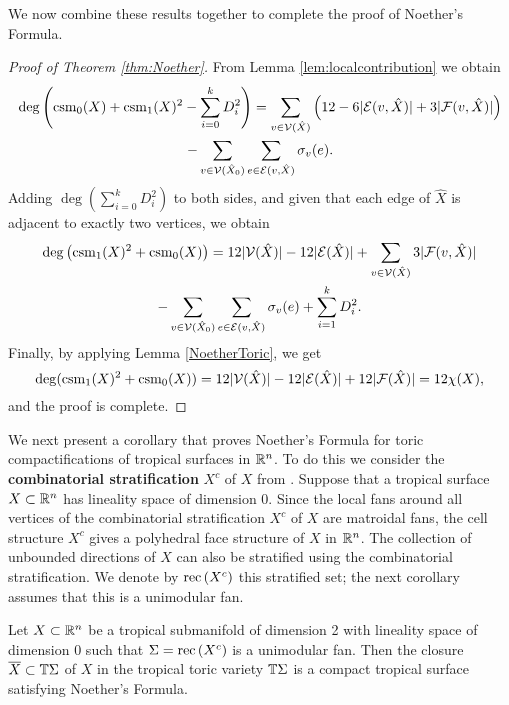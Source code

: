 We now combine these results together to complete the proof of Noether's Formula.

\begin{proof}[Proof of Theorem \ref{thm:Noether}]
From Lemma \ref{lem:localcontribution} we obtain
\begin{multline}\label{ChernSimp}
\deg \left( \operatorname{csm}_0(X) + \operatorname{csm}_1(X)^2 - \sum_{i = 0}^k D_i^2 \right) = 
\sum_{v \in {{\mathcal V}}(\hat{X})}  \left( 12 - 6|{{\mathcal E}}(v, \hat{X})| + 3|{{\mathcal F}}(v, \hat{X})| \right) \\ 
- \sum_{v \in {{\mathcal V}}(\hat{X}_0)}\sum_{e \in {{\mathcal E}}(v, \hat{X})} \sigma_v(e).
\end{multline}
Adding $\deg(\sum_{i = 0}^k D_i^2)$ to both sides, and given that each edge of $\hat X$ is adjacent to exactly two vertices, we obtain
\begin{multline*}
\deg \left(\operatorname{csm}_1(X)^2 + \operatorname{csm}_0(X) \right) =   12 |{{\mathcal V}}(\hat{X}) | - 12|{{\mathcal E}}(\hat{X})| + \sum_{v \in {{\mathcal V}}(\hat{X})}  3|{{\mathcal F}}(v, \hat{X})|  \\ 
- \sum_{v \in {{\mathcal V}}(\hat{X}_0)}\sum_{e \in {{\mathcal E}}(v, \hat{X})} \sigma_v(e) + \sum_{i = 1}^k D_i^2. 
\end{multline*}
Finally, by applying Lemma \ref{NoetherToric}, we get
$$\deg(\operatorname{csm}_1(X)^2 + \operatorname{csm}_0(X)) =   12 |{{\mathcal V}}(\hat{X}) | - 12|{{\mathcal E}}(\hat{X})| + 12|{\mathcal F}(\hat{X})| = 12 \chi(X),$$
and the proof is complete. 
\end{proof}



We next present a corollary that proves Noether's Formula for toric compactifications of tropical surfaces in $\mathbb{R}^n$. 
To do this we consider the {\bf combinatorial stratification} $X^c$ of $X$ from \cite[Section 1.5]{MikZha:Jac}. 
Suppose that a tropical surface $X \subset \mathbb{R}^n$ has lineality space of dimension $0$. 
Since
the local fans around all vertices of the combinatorial stratification $X^c$ of $X$ are matroidal fans, the cell structure $X^c$ gives a polyhedral face structure of $X$ in $\mathbb{R}^n$.
The collection of unbounded directions of $X$ can also be stratified using the combinatorial stratification. We denote by $\operatorname{rec}{(X^c)}$ this stratified set; the next corollary assumes that this is a unimodular fan.

\begin{cor}\label{cor:surfaceToricvariety}
Let $X \subset {\mathbb R}^n$ be a tropical submanifold of dimension 2 with lineality space of dimension $0$ such that $\Sigma = \operatorname{rec}{(X^c)}$ is a unimodular fan. Then the closure $\overline{X} \subset \mathbb{T}\Sigma$ of $X$ in the tropical toric variety $\mathbb{T}\Sigma$ is a compact tropical surface satisfying Noether's Formula. 
\end{cor}

